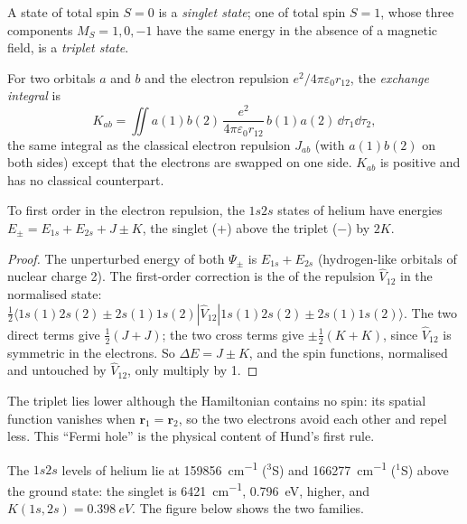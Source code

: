 \begin{definition}\label{def:b3:many-electron-atoms:singlet-triplet}
A state of total spin $S = 0$ is a \emph{singlet state};
one of total spin $S = 1$, whose three components $M_S = 1, 0, -1$ have the
same energy in the absence of a magnetic field, is a \emph{triplet
state}.
\end{definition}

\begin{definition}\label{def:b3:many-electron-atoms:exchange}
For two orbitals $a$ and $b$ and the electron repulsion $e^2/4\pi\varepsilon_0
r_{12}$, the \emph{exchange integral} is
\[
K_{ab} = \iint a(1)b(2)\,\frac{e^2}{4\pi\varepsilon_0r_{12}}\,b(1)a(2)\,\dd\tau_1\dd\tau_2,
\]
the same integral as the classical electron repulsion $J_{ab}$ (with
$a(1)b(2)$ on both sides) except that the electrons are swapped on one
side. $K_{ab}$ is positive and has no classical counterpart.
\end{definition}

\begin{proposition}\label{prop:b3:many-electron-atoms:helium}
To first order in the electron repulsion, the $1s2s$ states of helium have
energies $E_\pm = E_{1s} + E_{2s} + J \pm K$, the singlet ($+$) above the
triplet ($-$) by $2K$.
\end{proposition}

\begin{proof}
The unperturbed energy of both $\Psi_\pm$ is $E_{1s} + E_{2s}$ (hydrogen-like
orbitals of nuclear charge 2). The first-order correction is the
 of the repulsion $\hat V_{12}$ in the normalised state:
$\frac12\langle 1s(1)2s(2) \pm 2s(1)1s(2)|\hat V_{12}|1s(1)2s(2) \pm
2s(1)1s(2)\rangle$. The two direct terms give $\frac12(J + J)$; the two cross
terms give $\pm\frac12(K + K)$, since $\hat V_{12}$ is symmetric in the
electrons. So $\Delta E = J \pm K$, and the spin functions, normalised and
untouched by $\hat V_{12}$, only multiply by 1.
\end{proof}

The triplet lies lower although the Hamiltonian contains no spin: its
spatial function vanishes when $\mathbf r_1 = \mathbf r_2$, so the two
electrons avoid each other and repel less. This ``Fermi hole'' is the
physical content of Hund's first rule.

\begin{example}\label{ex:b3:many-electron-atoms:K}
The $1s2s$ levels of helium lie at \qty{159856}{cm^{-1}} (${}^3$S) and
\qty{166277}{cm^{-1}} (${}^1$S) above the ground state: the singlet is
\qty{6421}{cm^{-1}}, \qty{0.796}{eV}, higher, and $K(1s,2s) = \qty{0.398}{eV}$.
The figure below shows the two families.
\end{example}

